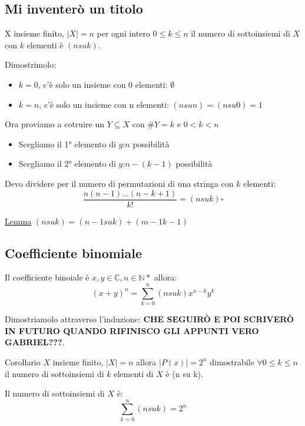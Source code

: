 \documentclass{article}
\begin{document}
\subsection{Mi inventerò un titolo}
X insieme finito, $|X| = n$ per ogni intero $0 \le k \le n$ il numero di sottoinsiemi di $X$ con $k$ elementi è $(n su k)$.

Dimostrimolo:
\begin{itemize}
        \item $k=0$, c'è solo un insieme con 0 elementi: $\emptyset$
        \item $k=n$, c'è solo un insieme con n elementi: $(n su n) = (n su 0) = 1$
\end{itemize}


Ora proviamo a cotruire un $Y \subseteq X$ con $\#Y = k$ e $0 < k < n$ \par
\begin{itemize}
        \item Scegliamo il 1° elemento di $y$:$n$ possibilità
        \item Scegliamo il 2° elemento di $y$:$n-(k-1)$ possibilità
\end{itemize}

Devo dividere per il numero di permutazioni di una stringa con $k$ elementi:
\begin{equation*}
        \frac{n(n-1)\ldots(n-k+1)}{k!} = (n su k) \square
\end{equation*}


\underline{Lemma} $(n su k) = (n-1 su k) + (m-1 k-1)$ 


\subsection{Coefficiente binomiale}
Il coefficiente binoiale è $x,y \in \mathbb{C}, n \in \mathbb{N}*$ allora:
\begin{equation*}
        {(x+y)}^{n} = \sum_{k=0}^{n}(n su k)x^{n-k}y^k
\end{equation*}

Dimostriamolo attraverso l'induzione: \newline
\textbf{CHE SEGUIRÒ E POI SCRIVERÒ IN FUTURO QUANDO RIFINISCO GLI APPUNTI VERO GABRIEL???}.


Corollario $X$ insieme finito, $|X| = n$ allora $|P(x)| = 2^n$ dimostrabile $\forall 0 \le k \le n$ il numero di sottoinsiemi di $k$ elementi di $X$ è (n su k). \par
Il numero di sottoinsiemi di $X$ è: 
\begin{equation*}
        \sum_{k=0}^{n}(n su k) = 2^n
\end{equation*}
\end{document}
